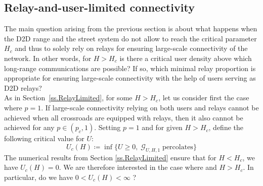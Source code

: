 \documentclass[conference]{IEEEtran}
\begin{document}
\subsection{Relay-and-user-limited connectivity}
\label{ss.Relay-and-Users}
The main question arising from the previous section is about what happens when the D2D range and the street system do not allow to reach the critical parameter $H_c$ and thus to solely rely on relays for ensuring large-scale connectivity of the network. In other words, for $H>H_c$ is there a critical user density above which long-range communications are possible? If so, which minimal relay proportion is appropriate for ensuring large-scale connectivity with the help of users serving as D2D relays? \\
\indent As in Section~\ref{ss.RelayLimited}, for some $H>H_c$, let us consider first the case where $p=1$. If large-scale connectivity relying on both users and relays cannot be achieved when all crossroads are equipped with relays, then it also cannot be achieved for any $p \in (p_c,1)$. Setting $p=1$ and for given $H>H_c$, define the following critical value for $U$:
\begin{equation}
\label{critical-U}
U_c(H) \coloneqq \inf \lbrace U \geq 0, \; \mathcal{G}_{U,H,1} \; \text{percolates} \rbrace  
\end{equation}
The numerical results from Section \ref{ss.RelayLimited} ensure that for $H<H_c$, we have $U_c(H)=0$. We are therefore interested in the case where and $H>H_c$. In particular, do we have $0 < U_{c}(H) < \infty$ ? 
\end{document}
